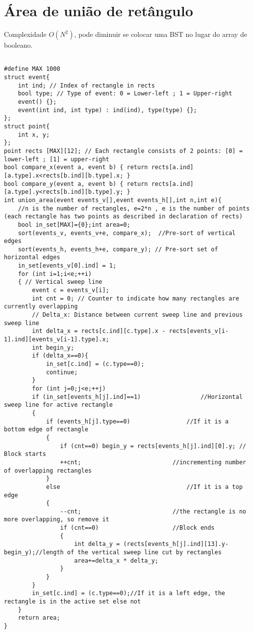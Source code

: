 \section{Área de união de retângulo}
Complexidade $O(N^2)$, pode diminuir se colocar uma BST no lugar do array de booleano.
\begin{multicols}{2}
	\begin{lstlisting}

#define MAX 1000
struct event{
	int ind; // Index of rectangle in rects
	bool type; // Type of event: 0 = Lower-left ; 1 = Upper-right
	event() {};
	event(int ind, int type) : ind(ind), type(type) {};
};
struct point{
	int x, y;
};
point rects [MAX][12]; // Each rectangle consists of 2 points: [0] = lower-left ; [1] = upper-right
bool compare_x(event a, event b) { return rects[a.ind][a.type].x<rects[b.ind][b.type].x; }
bool compare_y(event a, event b) { return rects[a.ind][a.type].y<rects[b.ind][b.type].y; }
int union_area(event events_v[],event events_h[],int n,int e){
	//n is the number of rectangles, e=2*n , e is the number of points (each rectangle has two points as described in declaration of rects)
	bool in_set[MAX]={0};int area=0;
	sort(events_v, events_v+e, compare_x);  //Pre-sort of vertical edges
	sort(events_h, events_h+e, compare_y); // Pre-sort set of horizontal edges
	in_set[events_v[0].ind] = 1;
	for (int i=1;i<e;++i) 
	{ // Vertical sweep line
		event c = events_v[i];
		int cnt = 0; // Counter to indicate how many rectangles are currently overlapping
		// Delta_x: Distance between current sweep line and previous sweep line
		int delta_x = rects[c.ind][c.type].x - rects[events_v[i-1].ind][events_v[i-1].type].x;
		int begin_y;
		if (delta_x==0){
			in_set[c.ind] = (c.type==0);
			continue;
		}
		for (int j=0;j<e;++j)
		if (in_set[events_h[j].ind]==1)                 //Horizontal sweep line for active rectangle
		{
			if (events_h[j].type==0)                //If it is a bottom edge of rectangle
			{
				if (cnt==0) begin_y = rects[events_h[j].ind][0].y; // Block starts
				++cnt;                          //incrementing number of overlapping rectangles
			}
			else                                    //If it is a top edge
			{
				--cnt;                          //the rectangle is no more overlapping, so remove it
				if (cnt==0)                     //Block ends
				{
					int delta_y = (rects[events_h[j].ind][13].y-begin_y);//length of the vertical sweep line cut by rectangles
					area+=delta_x * delta_y;
				}
			}
		}
		in_set[c.ind] = (c.type==0);//If it is a left edge, the rectangle is in the active set else not
	}
	return area;
}

\end{lstlisting}
\end{multicols}